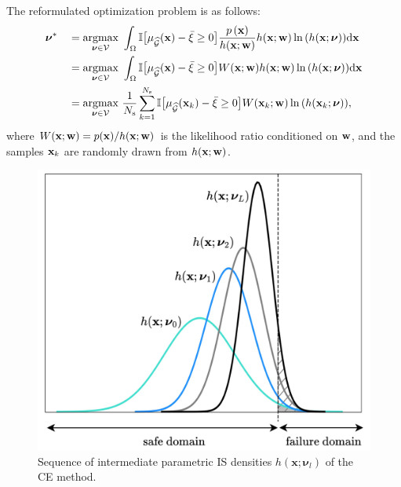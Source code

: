 \documentclass[preprint,3p]{elsarticle}
\begin{document}
\begin{linenumbers}
The reformulated optimization problem is as follows:
\begin{equation}
\begin{aligned} 
    \boldsymbol{\nu}^{*}\quad & =\underset{\boldsymbol{\nu} \in \mathcal{V}}{\text{argmax}}\ 
    \int_\Omega {\mathbb{I}\bigr[\mu_{\widehat{\mathcal{G}}}(\textbf{x}) - \bar\xi \geq 0 \bigl]\frac{p\left(\mathbf{x}\right)}{h(\mathbf{x};{\bf w})}{h(\mathbf{x};{\bf w})} \ln\left(h(\mathbf{x};\boldsymbol{\nu})\right)}\mathrm{d}\textbf{x}\\
    & =\underset{\boldsymbol{\nu} \in \mathcal{V}}{\text{argmax}}\ 
    \int_\Omega {\mathbb{I}\bigr[\mu_{\widehat{\mathcal{G}}}(\textbf{x}) - \bar\xi \geq 0 \bigl]{W(\mathbf{x};{\bf w})}{h(\mathbf{x};{\bf w})} \ln\left(h(\mathbf{x};\boldsymbol{\nu})\right)}\mathrm{d}\textbf{x}\\
    & =\underset{\boldsymbol{\nu}\in \mathcal{V}}{\text{argmax}}\ 
    \frac{1}{N_\text{s}}\displaystyle\sum_{k=1}^{N_\text{s}}{\mathbb{I}\bigr[\mu_{\widehat{\mathcal{G}}}(\textbf{x}_k) - \bar\xi \geq 0 \bigl]{W(\mathbf{x}_k;{\bf w})}\ln\left(h(\mathbf{x}_k;\boldsymbol{\nu})\right)},\\
\end{aligned}
\label{EQ:15}
\end{equation}
where $W(\mathbf{x};{\bf w}) = p({\bf x}) / h({\bf x};{\bf w})$ is the likelihood ratio conditioned on ${\bf w}$, and the samples ${\bf x}_k$ are randomly drawn from $h(\mathbf{x};{\bf w})$.

\begin{figure}[ht!]
	\begin{center}
		\includegraphics[scale=0.78]{Fig1.jpg}
	\end{center}
	\caption{Sequence of intermediate parametric IS densities $h(\mathbf{x};\boldsymbol{\nu}_l)$ of the CE method.} \label{FIG:1}
\end{figure}


\end{linenumbers}
\end{document}
